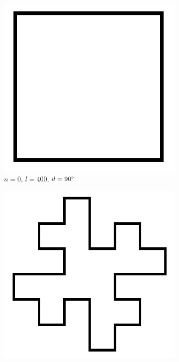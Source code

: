 \begin{figure} [hbtp]
	\centering
	\begin{subfigure}[t]{.3\textwidth}
		\includegraphics[width=\linewidth]{images/KochkurveN0L400.png}
		\caption{$n=0$, $l=400$, $d=90\degree$}
		\label{fig:KochkurveN0L400}
	\end{subfigure}
	\hspace{.1\textwidth}
	\begin{subfigure}[t]{.3\textwidth}
		\centering
		\includegraphics[width=\linewidth]{images/KochkurveN1L100.png}

\end{subfigure}
\end{figure}
